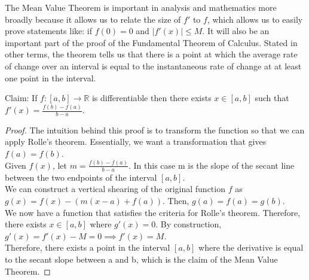 \documentclass{article}
\begin{document}
The Mean Value Theorem is important in analysis and mathematics more broadly because it allows us to relate the size of $f'$ to $f$, which allows us to easily prove statements like: if $f(0) = 0$ and $|f'(x)| \leq M$. It will also be an important part of the proof of the Fundamental Theorem of Calculus. Stated in other terms, the theorem tells us that there is a point at which the average rate of change over an interval is equal to the instantaneous rate of change at at least one point in the interval. \\


\begin{definition}
Claim: If $f: [a,b] \rightarrow \mathbb{R}$ is differentiable then there exists $x \in [a,b]$ such that $f'(x) = \frac{f(b) - f(a)}{b - a}$. 
\end{definition}

\begin{proof}
The intuition behind this proof is to transform the function so that we can apply Rolle's theorem. Essentially, we want a transformation that gives $f(a) = f(b)$. \\

Given $f(x)$, let $m = \frac{f(b) - f(a)}{b - a}$. In this case m is the slope of the secant line between the two endpoints of the interval $[a,b]$. \\

We can construct a vertical shearing of the original function $f$ as $g(x) = f(x) - (m(x-a) + f(a))$. Then, $g(a) = f(a) = g(b)$. \\

We now have a function that satisfies the criteria for Rolle's theorem. Therefore, there exists $x \in [a,b]$ where $g'(x) = 0$. By construction, $g'(x) = f'(x) - M = 0 \implies f'(x) = M$. \\

Therefore, there exists a point in the interval $[a,b]$ where the derivative is equal to the secant slope between a and b, which is the claim of the Mean Value Theorem. 
\end{proof}
\end{document}
